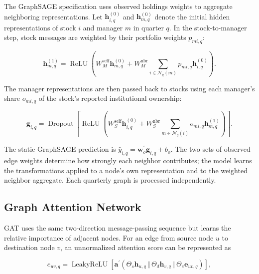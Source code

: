 The GraphSAGE specification uses observed holdings weights to aggregate neighboring representations. Let \(\mathbf{h}^{(0)}_{i,q}\) and \(\mathbf{h}^{(0)}_{m,q}\) denote the initial hidden representations of stock \(i\) and manager \(m\) in quarter \(q\). In the stock-to-manager step, stock messages are weighted by their portfolio weights \(p_{mi,q}\):

\begin{equation}
    \mathbf{h}^{(1)}_{m,q}
    =
    \operatorname{ReLU}
    \left(
        W^{\mathrm{self}}_M\mathbf{h}^{(0)}_{m,q}
        +
        W^{\mathrm{nbr}}_M
        \sum_{i\in\mathcal{N}_q(m)}
        p_{mi,q}\mathbf{h}^{(0)}_{i,q}
    \right).
    \label{eq:weighted_graphsage_manager}
\end{equation}

\noindent
The manager representations are then passed back to stocks using each manager's share \(o_{mi,q}\) of the stock's reported institutional ownership:

\begin{equation}
    \mathbf{g}_{i,q}
    =
    \operatorname{Dropout}
    \left[
    \operatorname{ReLU}
    \left(
        W^{\mathrm{self}}_S\mathbf{h}^{(0)}_{i,q}
        +
        W^{\mathrm{nbr}}_S
        \sum_{m\in\mathcal{N}_q(i)}
        o_{mi,q}\mathbf{h}^{(1)}_{m,q}
    \right)
    \right].
    \label{eq:weighted_graphsage_stock}
\end{equation}

\noindent
The static GraphSAGE prediction is \(\hat{y}_{i,q}=\mathbf{w}_o^{\prime}\mathbf{g}_{i,q}+b_o\). The two sets of observed edge weights determine how strongly each neighbor contributes; the model learns the transformations applied to a node's own representation and to the weighted neighbor aggregate. Each quarterly graph is processed independently.

\subsection{Graph Attention Network}

GAT uses the same two-direction message-passing sequence but learns the relative importance of adjacent nodes. For an edge from source node \(u\) to destination node \(v\), an unnormalized attention score can be represented as

\begin{equation}
    e_{uv,q}
    =
    \operatorname{LeakyReLU}
    \left[
        \mathbf{a}^{\prime}
        \left(
            \Theta_s\mathbf{h}_{u,q}
            \,\Vert\,
            \Theta_d\mathbf{h}_{v,q}
            \,\Vert\,
            \Theta_e\mathbf{e}_{uv,q}
        \right)
    \right],
    \label{eq:gat_attention_score}
\end{equation}


